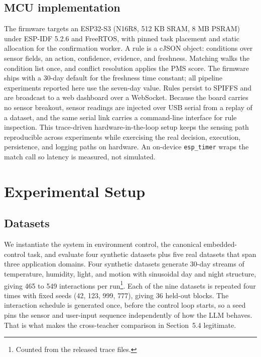 \documentclass[review]{elsarticle}
\begin{document}
\subsection{MCU implementation}

The firmware targets an ESP32-S3 (N16R8, 512 KB SRAM, 8 MB PSRAM) under
ESP-IDF 5.2.6 and FreeRTOS, with pinned task placement and static allocation
for the confirmation worker. A rule is a cJSON object:
conditions over sensor fields, an action, confidence, evidence, and
freshness. Matching walks the condition list once, and conflict resolution
applies the PMS score. The firmware ships with a 30-day default for the
freshness time constant; all pipeline experiments reported here use the
seven-day value. Rules persist to SPIFFS and are broadcast to a web dashboard
over a WebSocket. Because the board carries no sensor breakout,
sensor readings are injected over USB serial from a replay of a dataset, and
the same serial link carries a command-line interface for rule inspection.
This trace-driven hardware-in-the-loop setup keeps the sensing path
reproducible across experiments while exercising the real decision,
execution, persistence, and logging paths on hardware. An on-device
\texttt{esp\_timer} wraps the match call so latency is measured, not
simulated.

\section{Experimental Setup}

\subsection{Datasets}

We instantiate the system in environment control, the canonical
embedded-control task, and evaluate four synthetic datasets plus five real
datasets that span three application domains. Four synthetic datasets
generate 30-day streams of temperature, humidity, light, and motion with
sinusoidal day and night structure, giving 465 to 549 interactions per
run\footnote{Counted from the released trace files.}.
Each of the nine datasets is repeated four times with fixed seeds (42, 123,
999, 777), giving 36 held-out blocks. The interaction schedule is generated
once, before the control loop starts, so a seed pins the sensor and
user-input sequence independently of how the LLM behaves. That is what makes
the cross-teacher comparison in Section~5.4 legitimate.
\end{document}
